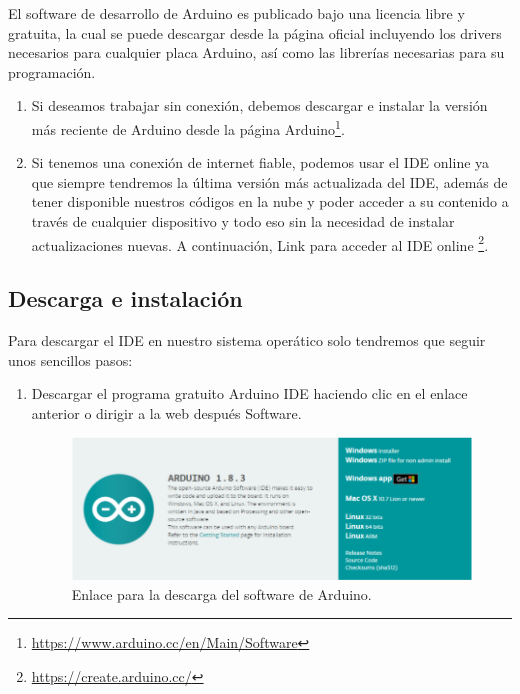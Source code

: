 \begin{appendix}
El software de desarrollo de Arduino es publicado bajo una licencia libre y gratuita, la cual se puede descargar desde la página oficial
incluyendo los drivers necesarios para cualquier placa Arduino, así como las librerías necesarias para su programación.

\begin{enumerate}
 \item Si deseamos trabajar sin conexión, debemos descargar e instalar la versión más reciente
de Arduino desde la página Arduino\footnote{\url{https://www.arduino.cc/en/Main/Software}}.
\item Si tenemos una conexión de internet fiable, podemos usar el IDE online ya que siempre
tendremos la última versión más actualizada del IDE, además de tener disponible
nuestros códigos en la nube y poder acceder a su contenido a través de cualquier
dispositivo y todo eso sin la necesidad de instalar actualizaciones nuevas. A
continuación, Link para acceder al IDE online \footnote{ \url{https://create.arduino.cc/}}.
\end{enumerate}

\subsection{Descarga e instalación}

Para descargar el IDE en nuestro sistema operático solo tendremos que seguir unos sencillos
pasos:

\begin{enumerate}
 \item Descargar el programa gratuito Arduino IDE haciendo clic en el enlace anterior o dirigir a
la web después Software.


\begin{figure}[H]
  \begin{center}
    \includegraphics[scale=0.3]{imagenes/descarga_arduino.png}
  \end{center}
  \label{fig:descarga_arduino}
 \caption{Enlace para la descarga del software de Arduino.}
 \end{figure}
 

\end{enumerate}
\end{appendix}
